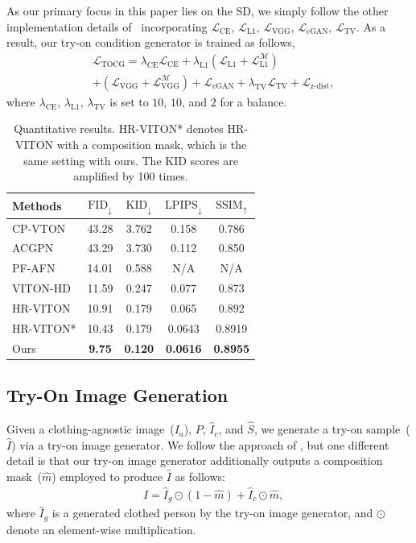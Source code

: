 \documentclass[letterpaper]{article} %
\begin{document}
As our primary focus in this paper lies on the SD, we simply follow the other implementation details of~\cite{lee2022hrviton} incorporating $\mathcal{L}_{\text{CE}}$, $\mathcal{L}_{\text{L1}}$, $\mathcal{L}_{\text{VGG}}$, $\mathcal{L}_{\text{cGAN}}$, $\mathcal{L}_{\text{TV}}$.
As a result, our try-on condition generator is trained as follows,
\begin{eqnarray}
    & \mathcal{L}_{\text{TOCG}} = \lambda_{\text{CE}}\mathcal{L}_{\text{CE}} + \lambda_{\text{L1}}(\mathcal{L}_{\text{L1}} + \mathcal{L}_{\text{L1}}^{\mathcal{M}})
    \nonumber \\ & + (\mathcal{L}_{\text{VGG}} + \mathcal{L}_{\text{VGG}}^{\mathcal{M}}) + \mathcal{L}_{\text{cGAN}} + \lambda_{\text{TV}}\mathcal{L}_{\text{TV}} + \mathcal{L}_{\text{z-dist}},
\end{eqnarray}
where $\lambda_{\text{CE}}$, $\lambda_{\text{L1}}$, $\lambda_{\text{TV}}$ is set to $10$, $10$, and $2$ for a balance.

\begin{table}[t]
	\centering
	\begin{tabular}{l|cc|cc}
		\toprule
		Methods  & $\text{FID}_\downarrow$ & $\text{KID}_\downarrow$ & $\text{LPIPS}_\downarrow$ & $\text{SSIM}_\uparrow$ \\
		\midrule
		\midrule
        CP-VTON & 43.28 & 3.762 & 0.158 & 0.786 \\
		ACGPN & 43.29 & 3.730 & 0.112 & 0.850 \\
		PF-AFN & 14.01 & 0.588 & N/A & N/A \\
        \midrule
        VITON-HD & 11.59 & 0.247 & 0.077 & 0.873 \\
        HR-VITON & 10.91 & 0.179 & 0.065 & 0.892 \\
        HR-VITON*  & 10.43 & 0.179 & 0.0643 & 0.8919 \\
        Ours & \textbf{9.75} & \textbf{0.120} & \textbf{0.0616} & \textbf{0.8955} \\
		\bottomrule
	\end{tabular}
    \caption{Quantitative results. HR-VITON* denotes HR-VITON with a composition mask, which is the same setting with ours. The KID scores are amplified by 100 times.
    }
	\label{tb_overall_result}
\end{table}

\subsection{Try-On Image Generation}
\label{sec_try_on_image_gen}
Given a clothing-agnostic image~($I_a$), $P$, $\hat{I}_c$, and $\hat{S}$, we generate a try-on sample~($\hat{I}$) via a try-on image generator.
We follow the approach of \cite{lee2022hrviton}, but one different detail is that our try-on image generator additionally outputs a composition mask~($\hat{m}$) employed to produce $\hat{I}$ as follows:
\begin{eqnarray}
    & \hat{I} = \hat{I}_g \odot (1 - \hat{m}) + \hat{I}_c \odot \hat{m},
\end{eqnarray}
where $\hat{I}_g$ is a generated clothed person by the try-on image generator, and $\odot$ denote an element-wise multiplication.
\end{document}
